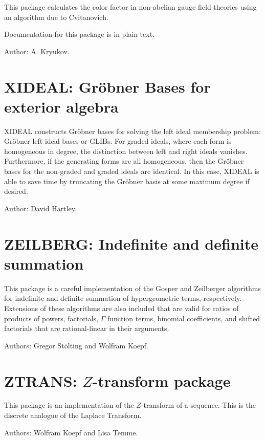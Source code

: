 
This package calculates the color factor in non-abelian gauge field
theories using an algorithm due to Cvitanovich.

Documentation for this package is in plain text.

Author: A. Kryukov.



\newpage

\section{XIDEAL: Gr\"obner Bases for exterior algebra} 

XIDEAL constructs Gr\"obner bases for solving the left ideal membership
problem: Gr\"obner left ideal bases or GLIBs. For graded ideals, where each
form is homogeneous in degree, the distinction between left and right
ideals vanishes. Furthermore, if the generating forms are all homogeneous,
then the Gr\"obner bases for the non-graded and graded ideals are
identical. In this case, XIDEAL is able to save time by truncating the
Gr\"obner basis at some maximum degree if desired.

Author: David Hartley.



\newpage

\section{ZEILBERG: Indefinite and definite summation}


This package is a careful implementation of the Gosper and Zeilberger
algorithms for indefinite and definite summation of hypergeometric terms,
respectively.  Extensions of these algorithms are also included that are
valid for ratios of products of powers, factorials, $\Gamma$ function
terms, binomial coefficients, and shifted factorials that are
rational-linear in their arguments.

Authors: Gregor St\"olting and Wolfram Koepf.



\newpage

\section{ZTRANS: \texorpdfstring{$Z$}{\textit{Z}}-transform package}


This package is an implementation of the $Z$-transform of a sequence.
This is the discrete analogue of the Laplace Transform.

Authors: Wolfram Koepf and Lisa Temme.



\let\sectionmark=\origsectionmark

